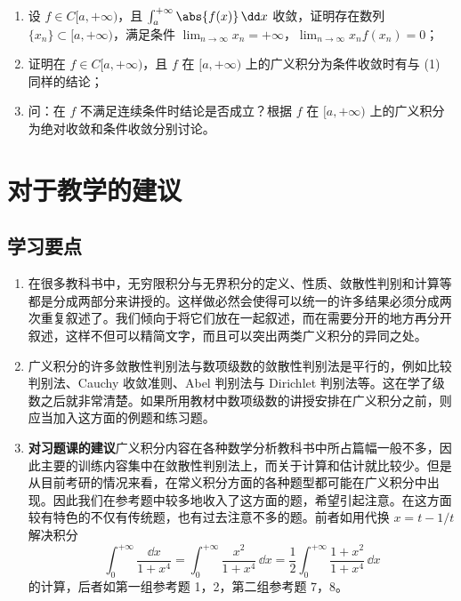 \begin{xexercise}[6]
\begin{enumerate}[label=(\arabic*)]
    \item 设 $f\in C[a,+\infty)$，且 $\int_a^{+\infty}\abs{f(x)}\,\dd x$ 收敛，证明存在数列 $\{x_n\}\subset[a,+\infty)$，满足条件 $\lim_{n\to\infty}x_n=+\infty$，$\lim_{n\to\infty}x_nf(x_n)=0$；
    \item 证明在 $f\in C[a,+\infty)$，且 $f$ 在 $[a,+\infty)$ 上的广义积分为条件收敛时有与 (1) 同样的结论；
    \item 问：在 $f$ 不满足连续条件时结论是否成立？根据 $f$ 在 $[a,+\infty)$ 上的广义积分为绝对收敛和条件收敛分别讨论。
  \end{enumerate}
\end{xexercise}

\section{对于教学的建议}

\subsection{学习要点}

\begin{enumerate}
  \item 在很多教科书中，无穷限积分与无界积分的定义、性质、敛散性判别和计算等都是分成两部分来讲授的。这样做必然会使得可以统一的许多结果必须分成两次重复叙述了。我们倾向于将它们放在一起叙述，而在需要分开的地方再分开叙述，这样不但可以精简文字，而且可以突出两类广义积分的异同之处。

  \item 广义积分的许多敛散性判别法与数项级数的敛散性判别法是平行的，例如比较判别法、Cauchy 收敛准则、Abel 判别法与 Dirichlet 判别法等。这在学了级数之后就非常清楚。如果所用教材中数项级数的讲授安排在广义积分之前，则应当加入这方面的例题和练习题。

  \item \textbf{对习题课的建议}\quad 广义积分内容在各种数学分析教科书中所占篇幅一般不多，因此主要的训练内容集中在敛散性判别法上，而关于计算和估计就比较少。但是从目前考研的情况来看，在常义积分方面的各种题型都可能在广义积分中出现。因此我们在参考题中较多地收入了这方面的题，希望引起注意。在这方面较有特色的不仅有传统题，也有过去注意不多的题。前者如用代换 $x=t-1/t$ 解决积分
  \[
    \int_0^{+\infty}\frac{\dd x}{1+x^4}
    =\int_0^{+\infty}\frac{x^2}{1+x^4}\,\dd x
    =\frac12\int_0^{+\infty}\frac{1+x^2}{1+x^4}\,\dd x
  \]
  的计算，后者如第一组参考题 1，2，第二组参考题 7，8。
\end{enumerate}

